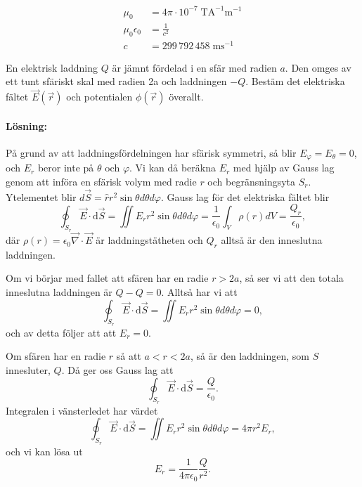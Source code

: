 \documentclass[%
oneside,                 %
final,                   %
10pt]{article}
\newenvironment{notice_mdfboxadmon}[1][]{
\begin{notice_mdfboxmdframed}[frametitle=#1]
}
{
\end{notice_mdfboxmdframed}
}
\newenvironment{warning_mdfboxadmon}[1][]{
\begin{warning_mdfboxmdframed}[frametitle=#1]
}
{
\end{warning_mdfboxmdframed}
}
\begin{document}
\begin{warning_mdfboxadmon}[SI enheter]
\begin{align}
\mu_0 &= 4 \pi \cdot 10^{-7} \; \mathrm{T}\mathrm{A}^{-1}\mathrm{m}^{-1} \nonumber \\
\mu_0 \epsilon_0 &= \frac{1}{c^2} \nonumber \\
c &= 299\,792\,458 \; \mathrm{m}\mathrm{s}^{-1} \nonumber
\end{align}
\end{warning_mdfboxadmon} %




\begin{notice_mdfboxadmon}

En elektrisk laddning $Q$ är jämnt fördelad i en sfär med radien $a$. Den omges av ett tunt sfäriskt skal med radien 2a och laddningen $-Q$. Bestäm det elektriska fältet $\vec{E}(\vec{r})$ och potentialen $\phi(\vec{r})$ överallt.

\paragraph{Lösning:}
På grund av att laddningsfördelningen har sfärisk
symmetri, så blir $E_\varphi = E_\theta = 0$, och $E_r$ beror inte på
$\theta$ och $\varphi$.  Vi kan då beräkna $E_r$ med hjälp av Gauss
lag genom att införa en sfärisk volym med radie $r$ och begränsningsyta $S_r$. Ytelementet blir $d\vec{S} = \hat{r} r^2 \sin\theta d\theta d\varphi$. Gauss lag för det elektriska fältet blir
\begin{equation}
  \oint_{S_r} \vec{E} \cdot \mbox{d}\vec{S} = \iint E_r r^2 \sin\theta d\theta d\varphi 
  = \frac{1}{\epsilon_0} \int_V \rho(r) dV = \frac{Q_r}{\epsilon_0},
\end{equation}
där $\rho(r) = \epsilon_0 \vec\nabla\cdot\vec E$ är laddningstätheten och $Q_r$ alltså är den inneslutna laddningen.

Om vi börjar med fallet att sfären har en radie $r > 2a$, så ser vi 
att den totala inneslutna laddningen är $Q - Q = 0$.  Alltså har
vi att 
\begin{equation}
  \oint_{S_r} \vec{E} \cdot \mbox{d}\vec{S} = \iint E_r r^2 \sin\theta d\theta d\varphi 
  = 0,
\end{equation}
och av detta följer att att $E_r = 0$.

Om sfären har en radie $r$ så att $a < r < 2a$, så är den laddningen,
som $S$ innesluter, $Q$.  Då ger oss Gauss lag att
\begin{equation}
  \oint_{S_r} \vec{E} \cdot \mbox{d}\vec{S} = \frac{Q}{\epsilon_0}.
\end{equation}
Integralen i vänsterledet har värdet
\begin{equation}
  \oint_{S_r} \vec{E} \cdot \mbox{d}\vec{S} = \iint E_r r^2 \sin\theta d\theta d\varphi = 4\pi r^2 E_r,
\end{equation}
och vi kan lösa ut
\begin{equation}
  E_r = \frac{1}{4\pi \epsilon_0} \frac{Q}{r^2}.
\end{equation}


\end{notice_mdfboxadmon}
\end{document}

